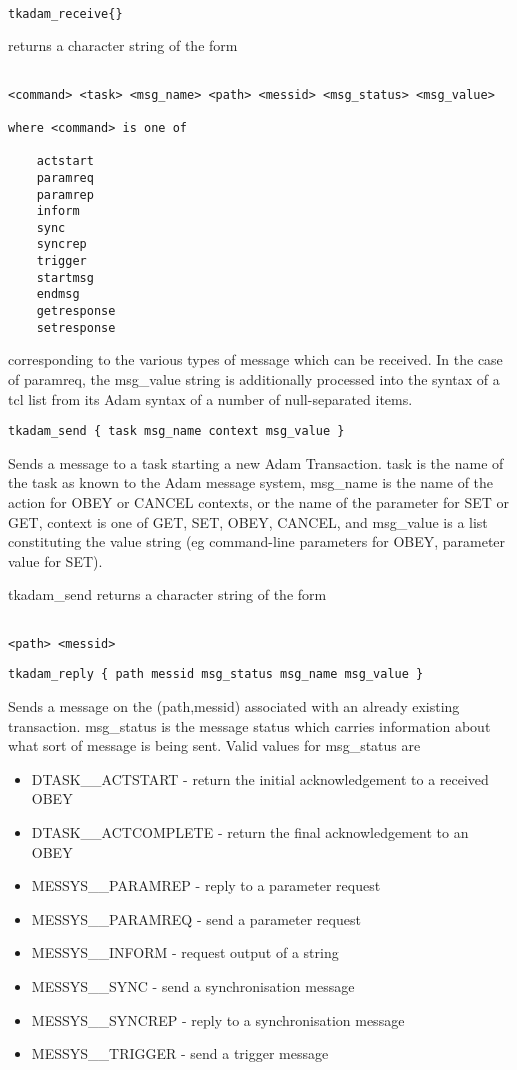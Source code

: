 \begin{verbatim}

tkadam_receive{}

\end{verbatim}
returns a character string of the form
\begin{verbatim}

<command> <task> <msg_name> <path> <messid> <msg_status> <msg_value>

where <command> is one of

	actstart
	paramreq
	paramrep
	inform
	sync
	syncrep
	trigger
	startmsg
	endmsg
	getresponse
	setresponse
\end{verbatim}

corresponding to the various types of message which can be received. In
the case of paramreq, the msg\_value string is additionally processed
into the syntax of a tcl list from its Adam syntax of a number of
null-separated items.

\begin{verbatim}
tkadam_send { task msg_name context msg_value }
\end{verbatim}

Sends a message to a task starting a new Adam Transaction.
task is the name of the task as known to the Adam message system,
msg\_name is the name of the action for OBEY or CANCEL contexts, or the
name of the parameter for SET or GET, context is one of GET, SET, OBEY,
CANCEL, and msg\_value is a list constituting the value string (eg
command-line parameters for OBEY, parameter value for SET).

tkadam\_send returns a character string of the form
\begin{verbatim}

<path> <messid>

\end{verbatim}

\begin{verbatim}
tkadam_reply { path messid msg_status msg_name msg_value }
\end{verbatim}

Sends a message on the (path,messid) associated with an already existing
transaction. msg\_status is the message status which carries information
about what sort of message is being sent. Valid values for msg\_status are

\begin{itemize}
\item DTASK\_\_ACTSTART - return the initial acknowledgement to a
received OBEY
\item DTASK\_\_ACTCOMPLETE - return the final acknowledgement to an OBEY
\item MESSYS\_\_PARAMREP - reply to a parameter request
\item MESSYS\_\_PARAMREQ - send a parameter request
\item MESSYS\_\_INFORM - request output of a string
\item MESSYS\_\_SYNC - send a synchronisation message
\item MESSYS\_\_SYNCREP - reply to a synchronisation message
\item MESSYS\_\_TRIGGER - send a trigger message
\end{itemize}



